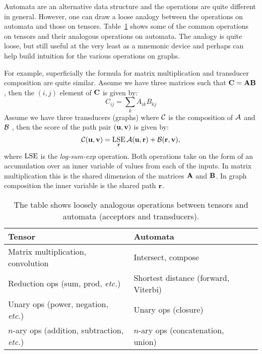 \documentclass[main.tex]{subfiles}
\begin{document}
Automata are an alternative data structure and the operations are quite
different in general. However, one can draw a loose analogy between the
operations on automata and those on tensors.
Table~\ref{tab:tensor_wfst_analogy} shows some of the common operations on
tensors and their analogous operations on automata. The analogy is quite loose,
but still useful at the very least as a mnemonic device and perhaps can help
build intuition for the various operations on graphs.

For example, superficially the formula for matrix multiplication and transducer
composition are quite similar. Assume we have three matrices such that ${\bf C} = {\bf A}
{\bf B}$, then the $(i, j)$ element of ${\bf C}$ is given by:
\begin{equation}
    C_{ij} = \sum_{k} A_{ik} B_{kj}
\end{equation}
Assume we have three transducers (graphs) where $\mathcal{C}$ is the composition of
$\mathcal{A}$ and $\mathcal{B}$ , then the score of the path pair $({\bf u}, {\bf v})$ is given by:
\begin{equation}
    \mathcal{C}({\bf u}, {\bf v}) = \operatorname*{\textrm{LSE}}_{{\bf r}} \mathcal{A}({\bf u}, {\bf r}) + \mathcal{B}({\bf r}, {\bf v}),
\end{equation}
where $\operatorname*{\textrm{LSE}}$ is the \emph{log-sum-exp} operation.
Both operations take on the form of an accumulation over an inner variable of
values from each of the inputs. In matrix multiplication this is the shared
dimension of the matrices ${\bf A}$ and ${\bf B}$. In graph composition the inner
variable is the shared path ${\bf r}$.

\begin{table}[ht]
    \renewcommand{\arraystretch}{1.4}
    \caption{The table shows loosely analogous operations between tensors and
    automata (acceptors and transducers).}
    \centering
    \begin{tabular}{l l l}
    \toprule
        Tensor & Automata \\
    \midrule
        Matrix multiplication, convolution & Intersect, compose \\
        \rowcolor{Gray} Reduction ops (sum, prod, \emph{etc.}) & Shortest distance (forward, Viterbi) \\
        Unary ops (power, negation, \emph{etc.})  & Unary ops (closure) \\
        \rowcolor{Gray} $n$-ary ops (addition, subtraction, \emph{etc.})  & $n$-ary ops (concatenation, union) \\
    \bottomrule
    \end{tabular}
    \label{tab:tensor_wfst_analogy}
\end{table}
\end{document}

